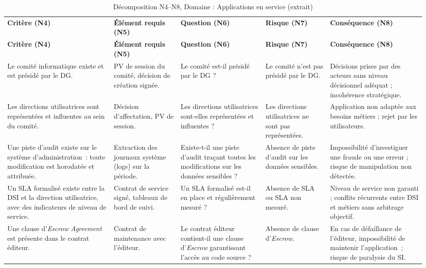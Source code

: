 \begin{longtable}{p{2.3cm}p{2.3cm}p{2.1cm}p{2.0cm}p{2.3cm}}
\small
\caption{Décomposition N4--N8, Domaine : Applications en service (extrait)} \\
\toprule
\textbf{Critère (N4)} & \textbf{Élément requis (N5)} & \textbf{Question (N6)} & \textbf{Risque (N7)} & \textbf{Conséquence (N8)} \\
\midrule
\endfirsthead
\toprule
\textbf{Critère (N4)} & \textbf{Élément requis (N5)} & \textbf{Question (N6)} & \textbf{Risque (N7)} & \textbf{Conséquence (N8)} \\
\midrule
\endhead
\bottomrule
\endlastfoot

Le comité informatique existe et est présidé par le DG. &
PV de session du comité, décision de création signée. &
Le comité est-il présidé par le DG ? &
Le comité n'est pas présidé par le DG. &
Décisions prises par des acteurs sans niveau décisionnel adéquat ; incohérence stratégique. \\
\addlinespace

Les directions utilisatrices sont représentées et influentes au sein du comité. &
Décision d'affectation, PV de session. &
Les directions utilisatrices sont-elles représentées et influentes ? &
Les directions utilisatrices ne sont pas représentées. &
Application non adaptée aux besoins métiers ; rejet par les utilisateurs. \\
\addlinespace

Une piste d'audit existe sur le système d'administration~: toute modification est horodatée et attribuée. &
Extraction des journaux système (logs) sur la période. &
Existe-t-il une piste d'audit traçant toutes les modifications sur les données sensibles ? &
Absence de piste d'audit sur les données sensibles. &
Impossibilité d'investiguer une fraude ou une erreur ; risque de manipulation non détectée. \\
\addlinespace

Un SLA formalisé existe entre la DSI et la direction utilisatrice, avec des indicateurs de niveau de service. &
Contrat de service signé, tableaux de bord de suivi. &
Un SLA formalisé est-il en place et régulièrement mesuré ? &
Absence de SLA ou SLA non mesuré. &
Niveau de service non garanti ; conflits récurrents entre DSI et métiers sans arbitrage objectif. \\
\addlinespace

Une clause d'\textit{Escrow Agreement} est présente dans le contrat éditeur. &
Contrat de maintenance avec l'éditeur. &
Le contrat éditeur contient-il une clause d'\textit{Escrow} garantissant l'accès au code source ? &
Absence de clause d'\textit{Escrow}. &
En cas de défaillance de l'éditeur, impossibilité de maintenir l'application~; risque de paralysie du SI. \\

\end{longtable}

